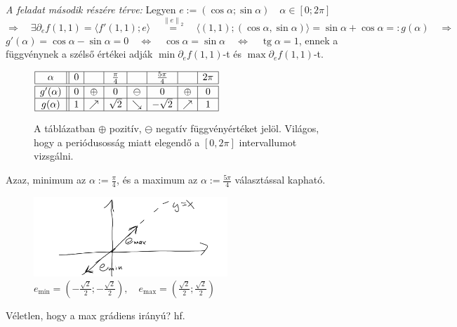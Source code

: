 \documentclass[a4paper,11.5pt]{article}
\DeclareMathOperator{\tg}{tg}
\newcommand{\norm}[1]{\left\lVert#1\right\rVert}
\begin{document}
	\textit{A feladat második részére térve:} Legyen $e:=(\cos\alpha; \sin\alpha)\quad \alpha\in[0;2\pi]$
	\[ \Rightarrow\quad \exists\partial_ef(1,1)=\langle f'(1,1);e\rangle\quad \overset{\norm{e}_2}{=}\quad \langle(1,1);(\cos\alpha,\sin\alpha)\rangle=\sin\alpha+\cos\alpha=:g(\alpha)\quad \Rightarrow \]
	$g'(\alpha)=\cos\alpha-\sin\alpha=0\quad \Leftrightarrow\quad \cos\alpha=\sin\alpha\quad \Leftrightarrow\quad \tg\alpha=1$, ennek a függvénynek a szélső értékei adják $\min\partial_ef(1,1)$-t és $\max\partial_ef(1,1)$-t.
	\setlength\extrarowheight{2pt}
	\begin{figure}[H]
		\centering
		$\begin{array}{|c||c|c|c|c|c|c|c|}
		\hline
		\alpha&0&&\frac{\pi}{4}&&\frac{5\pi}{4}&&2\pi\\
		\hline
		\hline
		g'(\alpha)&0&\oplus&0&\ominus&0&\oplus&0\\
		\hline
		g(\alpha)&1&\nearrow&\sqrt{2}&\searrow&-\sqrt{2}&\nearrow&1\\
		\hline
		\end{array}$
		\caption{A táblázatban $\oplus$ pozitív, $\ominus$ negatív függvényértéket jelöl. Világos, hogy a periódusosság miatt elegendő a $[0,2\pi]$ intervallumot vizsgálni. }
	\end{figure}
	Azaz, minimum az $\alpha:=\frac{\pi}{4}$, és a maximum az $\alpha:=\frac{5\pi}{4}$ választással kapható.
	\begin{figure}[H]
		\centering
		\includegraphics[height=3cm]{../2zh/kepek/33.png}
		\caption{$e_{\min}= \left(-\frac{\sqrt{2}}{2};-\frac{\sqrt{2}}{2}\right),\quad e_{\max}= \left(\frac{\sqrt{2}}{2};\frac{\sqrt{2}}{2}\right)$}
	\end{figure}
	\begin{exercise}	
		Véletlen, hogy a max grádiens irányú? hf.
	\end{exercise}
\end{document}
